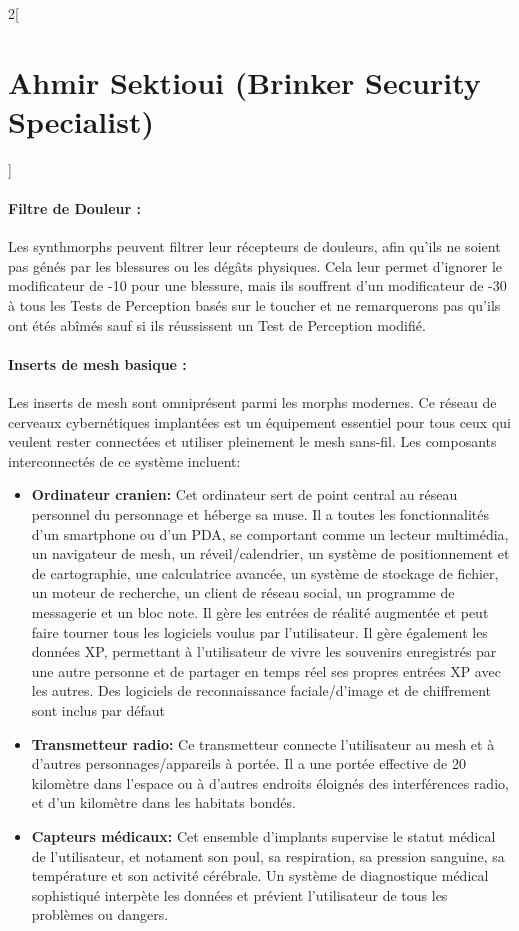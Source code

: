 \documentclass[a4paper,9pt]{article}
\begin{document}
\begin{multicols}{2}[\section*{Ahmir Sektioui (Brinker Security Specialist)}]
   \paragraph{Filtre de Douleur :} Les synthmorphs peuvent filtrer leur
   récepteurs de douleurs, afin qu'ils ne soient pas génés par les blessures
   ou les dégâts physiques. Cela leur permet d'ignorer le modificateur de -10
   pour une blessure, mais ils souffrent d'un modificateur de -30 à tous les
   Tests de Perception basés sur le toucher et ne remarquerons pas qu'ils ont
   étés abîmés sauf si ils réussissent un Test de Perception modifié. 

   \paragraph{Inserts de mesh basique :} 
   Les inserts de mesh sont omniprésent parmi les morphs modernes. Ce réseau de
   cerveaux cybernétiques implantées est un équipement essentiel pour tous ceux
   qui veulent rester connectées et utiliser pleinement le mesh sans-fil. Les
   composants interconnectés de ce système incluent: 

   \begin{itemize}
      \item \textbf{Ordinateur cranien:} Cet ordinateur sert de point central au
         réseau personnel du personnage et héberge sa muse. Il a toutes
         les fonctionnalités d'un smartphone ou d'un PDA, se comportant comme un
         lecteur multimédia, un navigateur de mesh, un réveil/calendrier, un
         système de positionnement et de cartographie, une calculatrice avancée,
         un système de stockage de fichier, un moteur de recherche, un client de
         réseau social, un programme de messagerie et un bloc note. Il gère les
         entrées de réalité augmentée et peut faire tourner tous les logiciels
         voulus par l'utilisateur. Il gère également les données XP, permettant à
         l'utilisateur de vivre les souvenirs enregistrés par une autre personne et
         de partager en temps réel ses propres entrées XP avec les autres. Des
         logiciels de reconnaissance faciale/d'image et de chiffrement
         sont inclus par défaut
      \item \textbf{Transmetteur radio:} Ce transmetteur connecte l'utilisateur au
         mesh et à d'autres personnages/appareils à portée. Il a une portée
         effective de 20 kilomètre dans l'espace ou à d'autres endroits éloignés
         des interférences radio, et d'un kilomètre dans les habitats bondés.
      \item \textbf{Capteurs médicaux:} Cet ensemble d'implants supervise le
         statut médical de l'utilisateur, et notament son poul, sa respiration, sa
         pression sanguine, sa température et son activité cérébrale. Un système de
         diagnostique médical sophistiqué interpète les données et prévient
         l'utilisateur de tous les problèmes ou dangers.
   \end{itemize} 


\end{multicols}
\end{document}
